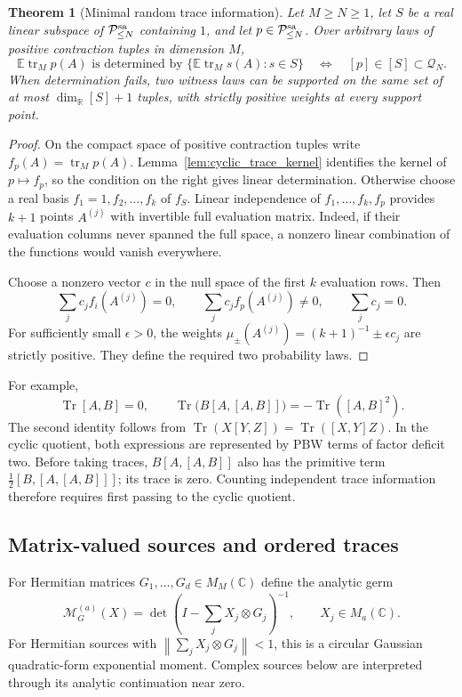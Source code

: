 \documentclass[11pt,a4paper]{amsart}
\numberwithin{equation}{section}
\newtheorem{theorem}{Theorem}[section]
\theoremstyle{definition}
\theoremstyle{remark}
\newcommand{\R}{\mathbb R}
\newcommand{\C}{\mathbb C}
\newcommand{\E}{\mathbb E}
\newcommand{\PP}{\mathcal P}
\DeclareMathOperator{\Tr}{Tr}
\DeclareMathOperator{\tr}{tr}
\newcommand{\norm}[1]{\left\lVert#1\right\rVert}
\begin{document}
\begin{theorem}[Minimal random trace information]\label{thm:trace_minimality}
Let $M\ge N\ge1$, let $S$ be a real linear subspace of $\PP_{\le N}^{\rm sa}$ containing $1$, and let $p\in\PP_{\le N}^{\rm sa}$. Over arbitrary laws of positive contraction tuples in dimension $M$,
\begin{equation}\label{eq:trace_minimality_iff}
 \E\tr_Mp(A)\text{ is determined by }\{\E\tr_Ms(A):s\in S\}
 \quad\Longleftrightarrow\quad[p]\in[S]\subset\mathscr Q_N.
\end{equation}
When determination fails, two witness laws can be supported on the same set of at most $\dim_\R[S]+1$ tuples, with strictly positive weights at every support point.
\end{theorem}
\begin{proof}
On the compact space of positive contraction tuples write $f_p(A)=\tr_Mp(A)$. Lemma~\ref{lem:cyclic_trace_kernel} identifies the kernel of $p\mapsto f_p$, so the condition on the right gives linear determination. Otherwise choose a real basis $f_1=1,f_2,\ldots,f_k$ of $f_S$. Linear independence of $f_1,\ldots,f_k,f_p$ provides $k+1$ points $A^{(j)}$ with invertible full evaluation matrix. Indeed, if their evaluation columns never spanned the full space, a nonzero linear combination of the functions would vanish everywhere.

Choose a nonzero vector $c$ in the null space of the first $k$ evaluation rows. Then
\[
 \sum_jc_jf_i(A^{(j)})=0,\qquad
 \sum_jc_jf_p(A^{(j)})\ne0,\qquad \sum_jc_j=0.
\]
For sufficiently small $\epsilon>0$, the weights
$\mu_\pm(A^{(j)})=(k+1)^{-1}\pm\epsilon c_j$
are strictly positive. They define the required two probability laws.
\end{proof}

For example,
\[
 \Tr[A,B]=0,\qquad
 \Tr\big(B[A,[A,B]]\big)=-\Tr([A,B]^2).
\]
The second identity follows from $\Tr(X[Y,Z])=\Tr([X,Y]Z)$. In the cyclic quotient, both expressions are represented by PBW terms of factor deficit two. Before taking traces, $B[A,[A,B]]$ also has the primitive term $\tfrac12[B,[A,[A,B]]]$; its trace is zero. Counting independent trace information therefore requires first passing to the cyclic quotient.

\subsection{Matrix-valued sources and ordered traces}
For Hermitian matrices $G_1,\ldots,G_d\in M_M(\C)$ define the analytic germ
\begin{equation}\label{eq:matrix_source_germ}
 \mathcal M_G^{(a)}(X)=\det\left(I-\sum_jX_j\otimes G_j\right)^{-1},
 \qquad X_j\in M_a(\C).
\end{equation}
For Hermitian sources with $\norm{\sum_jX_j\otimes G_j}<1$, this is a circular Gaussian quadratic-form exponential moment. Complex sources below are interpreted through its analytic continuation near zero.
\end{document}

